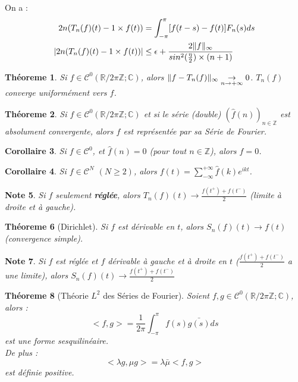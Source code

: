 \documentclass[a4paper, oneside]{report}
\theoremstyle{break}
\newtheorem{thm}{Théoreme}[section] %
\newtheorem{cor}[thm]{Corollaire}
\newtheorem{note}[thm]{Note}
\newcommand{\x}{\times}
\newcommand{\R}{\mathbb{R}}
\newcommand{\C}{\mathbb{C}}
\newcommand{\Z}{\mathbb{Z}}
\newcommand{\fracun}[1]{\frac{1}{#1}}
\DeclarePairedDelimiter\norm{\lVert}{\rVert}%
\begin{document}
On a :
\begin{align*}
2n(T_n(f)(t)-1\x f(t))&=\int_{-\pi}^{\pi}[f(t-s)-f(t)]F_n(s)ds\\
|2n(T_n(f)(t)-1\x f(t))| &\leq \epsilon + \frac{2\norm{f}_\infty}{sin^2(\frac{\eta}{2})\x (n+1)}
\end{align*}

\begin{thm}
Si $f\in \mathcal{C}^0(\R/2\pi\Z; \C)$, alors $\norm{f-T_n(f)}_\infty \underset{n\rightarrow +\infty}{\rightarrow}0$. $T_n(f)$ converge uniformément vers $f$.
\end{thm}

\begin{thm}
Si $f\in \mathcal{C}^0(\R/2\pi\Z; \C)$ et si le série (double) $(\widehat{f}(n))_{n\in \Z}$ est absolument convergente, alors $f$ est représentée par sa Série de Fourier.
\end{thm}

\begin{cor}
Si $f \in \mathcal{C}^0$, et $\widehat{f}(n)=0$ (pour tout $n\in \Z$), alors $f=0$.
\end{cor}

\begin{cor}
Si $f \in \mathcal{C}^N$ $(N\geq 2)$, alors $f(t)=\sum_{-\infty}^{+\infty}\widehat{f}(k)e^{ikt}$.
\end{cor}

\begin{note}
Si $f$ seulement \textbf{réglée}, alors $T_n(f)(t) \rightarrow \frac{f(t^+)+f(t^-)}{2}$ (limite à droite et à gauche).
\end{note}

\begin{thm}[Dirichlet]
Si $f$ est dérivable en $t$, alors $S_n(f)(t)\rightarrow f(t)$ (convergence simple).
\end{thm}

\begin{note}
Si $f$ est réglée et $f$ dérivable à gauche et à droite en $t$ ($\frac{f(t^+)+f(t^-)}{2}$ a une limite), alors $S_n(f)(t)\rightarrow \frac{f(t^+)+f(t^-)}{2}$
\end{note}

\begin{thm}[Théorie $L^2$ des Séries de Fourier]
Soient $f,g \in \mathcal{C}^0(\R/2\pi\Z; \C)$, alors :
$$<f,g> = \fracun{2\pi}\int_{-\pi}^{\pi}f(s)\bar{g(s)}ds$$
est une forme sesquilinéaire.\\
De plus :
$$<\lambda g, \mu g> = \lambda \bar{\mu} <f,g>$$
est définie positive.
\end{thm}
\end{document}
